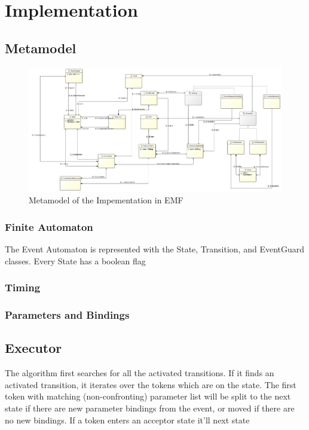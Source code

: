				
				
	\section{Implementation}
		\subsection{Metamodel}
		
			\begin{figure}[h]
			\centering
			\includegraphics[width=0.9\linewidth]{include/figures/chapter_5/model}
			\caption{Metamodel of the Impementation in EMF}
			\label{fig:cep:model}
			\end{figure}
		
			\subsubsection{Finite Automaton}
				The Event Automaton is represented with the State, Transition, and EventGuard classes.
				Every State has a boolean flag 
			\subsubsection{Timing}
			
			\subsubsection{Parameters and Bindings}
			
		
		\subsection{Executor}
			The algorithm first searches for all the activated transitions.
			If it finds an activated transition, it iterates over the tokens which are on the state. The first token with matching (non-confronting)
			parameter list will be split to the next state if there are new parameter bindings from the event, or moved if there are no new bindings.
			If a token enters an acceptor state it'll 
			next state 
